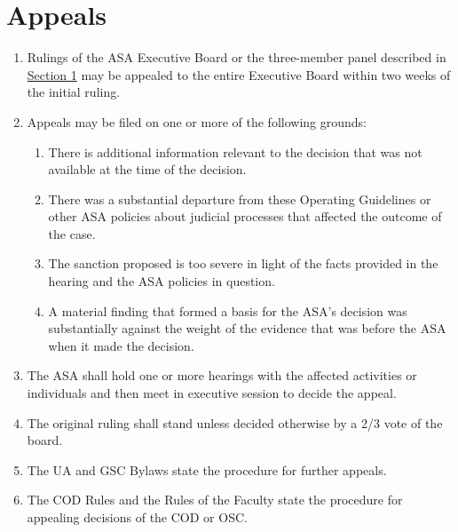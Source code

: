 \documentclass[12pt]{article}
\begin{document}
\section{Appeals}
\begin{enumerate}
    \item Rulings of the ASA Executive Board or the three-member panel described in \hyperref[art:V_sect1]{Section 1} may
be appealed to the entire Executive Board within two weeks of the initial ruling.
    \item Appeals may be filed on one or more of the following grounds:
    \begin{enumerate}[noitemsep, label=\alph*.]
        \item There is additional information relevant to the decision that was not available at the
time of the decision.
        \item There was a substantial departure from these Operating Guidelines or other ASA
policies about judicial processes that affected the outcome of the case.
        \item The sanction proposed is too severe in light of the facts provided in the hearing and
the ASA policies in question.
        \item A material finding that formed a basis for the ASA's decision was substantially against
the weight of the evidence that was before the ASA when it made the decision.
    \end{enumerate}
    \item The ASA shall hold one or more hearings with the affected activities or individuals and then
meet in executive session to decide the appeal.
    \item The original ruling shall stand unless decided otherwise by a 2/3 vote of the board.
    \item The UA and GSC Bylaws state the procedure for further appeals.
    \item The COD Rules and the Rules of the Faculty state the procedure for appealing decisions of
the COD or OSC.
\end{enumerate}

\newpage

\end{document}
